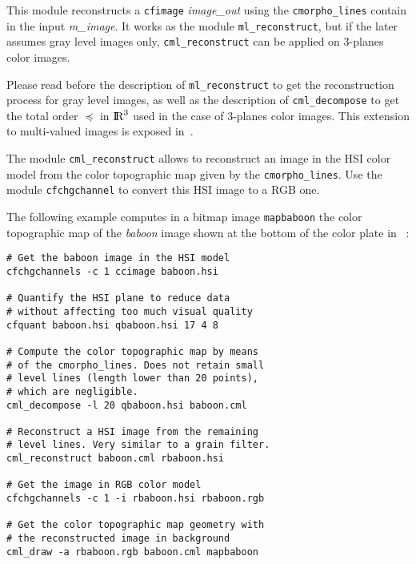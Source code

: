 \def\R{\hbox{I\kern-.2em\hbox{R}}}
\def\Leq{\preceq}

This module reconstructs a {\tt cfimage} {\em image\_out}
using the  {\tt cmorpho\_lines} contain in the input {\em m\_image}.
It works as the module {\tt ml\_reconstruct}, but if the later 
assumes gray level images only, {\tt cml\_reconstruct} can be
applied on 3-planes color images.

Please read before the description of {\tt ml\_reconstruct} to get
the reconstruction process for gray level images, as well as the 
description of {\tt cml\_decompose} to get the total order $\Leq$ in $\R^3$ 
used in the case of 3-planes color images.
This extension to multi-valued images is exposed in~\cite{coll.froment:topographic}.

The module {\tt cml\_reconstruct} allows to reconstruct an image in the HSI color model
from the color topographic map given by the {\tt cmorpho\_lines}.
Use the module {\tt cfchgchannel} to convert this HSI image to a RGB one.

\medskip
The following example computes in a bitmap image {\tt mapbaboon} the color topographic 
map of the {\em baboon} image shown at the bottom of the color plate 
in~\cite{coll.froment:topographic} :

\begin{verbatim}
# Get the baboon image in the HSI model
cfchgchannels -c 1 ccimage baboon.hsi

# Quantify the HSI plane to reduce data
# without affecting too much visual quality
cfquant baboon.hsi qbaboon.hsi 17 4 8

# Compute the color topographic map by means
# of the cmorpho_lines. Does not retain small 
# level lines (length lower than 20 points),
# which are negligible.
cml_decompose -l 20 qbaboon.hsi baboon.cml

# Reconstruct a HSI image from the remaining
# level lines. Very similar to a grain filter.
cml_reconstruct baboon.cml rbaboon.hsi

# Get the image in RGB color model
cfchgchannels -c 1 -i rbaboon.hsi rbaboon.rgb

# Get the color topographic map geometry with
# the reconstructed image in background
cml_draw -a rbaboon.rgb baboon.cml mapbaboon
\end{verbatim}